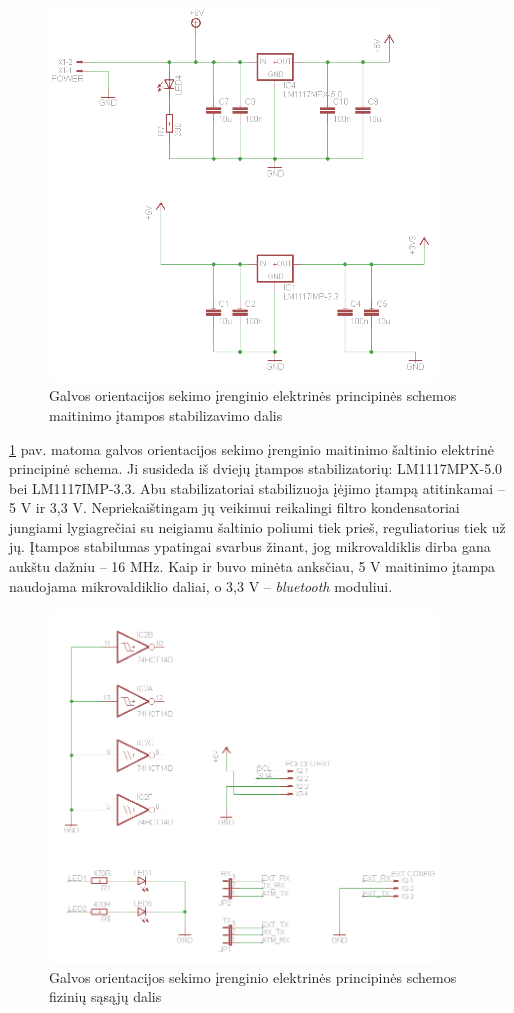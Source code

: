 \documentclass[]{vgtuef}
\begin{document}
\begin{figure}[htbp]
  \centering
  \includegraphics[width=390px]{img/head_tracker_stabilizer.png}
  \caption{Galvos orientacijos sekimo įrenginio elektrinės principinės schemos maitinimo įtampos stabilizavimo dalis}
  \label{fig:headtracker_stabilizer}
\end{figure}

\ref{fig:headtracker_stabilizer} pav. matoma galvos orientacijos sekimo įrenginio maitinimo šaltinio elektrinė principinė schema. Ji susideda iš dviejų įtampos stabilizatorių:  LM1117MPX-5.0 bei LM1117IMP-3.3. Abu stabilizatoriai stabilizuoja įėjimo įtampą atitinkamai – 5 V ir 3,3 V. Nepriekaištingam jų veikimui reikalingi filtro kondensatoriai jungiami lygiagrečiai su neigiamu šaltinio poliumi tiek prieš, reguliatorius tiek už jų. Įtampos stabilumas ypatingai svarbus žinant, jog mikrovaldiklis dirba gana aukštu dažniu – 16 MHz. Kaip ir buvo minėta anksčiau, 5 V maitinimo įtampa naudojama mikrovaldiklio daliai, o 3,3 V – \textit{bluetooth} moduliui.

\begin{figure}[htbp]
  \centering
  \includegraphics[width=390px]{img/head_tracker_links.png}
  \caption{Galvos orientacijos sekimo įrenginio elektrinės principinės schemos fizinių sąsąjų dalis}
  \label{fig:headtracker_links}
\end{figure}
\end{document}
